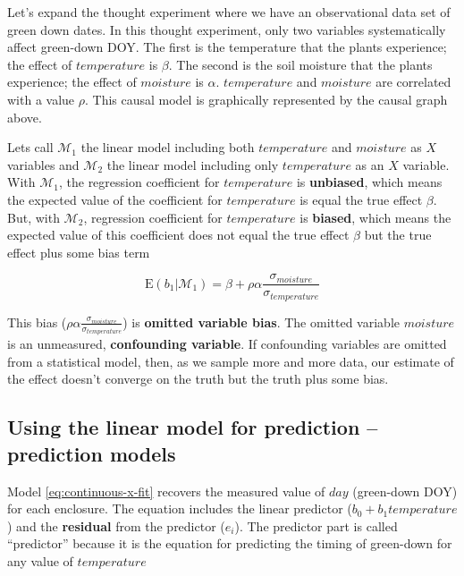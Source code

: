 \documentclass[]{book}
\begin{document}
Let's expand the thought experiment where we have an observational data set of green down dates. In this thought experiment, only two variables systematically affect green-down DOY. The first is the temperature that the plants experience; the effect of \(temperature\) is \(\beta\). The second is the soil moisture that the plants experience; the effect of \(moisture\) is \(\alpha\). \(temperature\) and \(moisture\) are correlated with a value \(\rho\). This causal model is graphically represented by the causal graph above.

Lets call \(\mathcal{M}_1\) the linear model including both \(temperature\) and \(moisture\) as \(X\) variables and \(\mathcal{M}_2\) the linear model including only \(temperature\) as an \(X\) variable. With \(\mathcal{M}_1\), the regression coefficient for \(temperature\) is \textbf{unbiased}, which means the expected value of the coefficient for \(temperature\) is equal the true effect \(\beta\). But, with \(\mathcal{M}_2\), regression coefficient for \(temperature\) is \textbf{biased}, which means the expected value of this coefficient does not equal the true effect \(\beta\) but the true effect plus some bias term

\begin{equation}
\mathrm{E}(b_1|\mathcal{M}_1) = \beta + \rho \alpha \frac{\sigma_{moisture}}{\sigma_{temperature}}
\end{equation}

This bias (\(\rho \alpha \frac{\sigma_{moisture}}{\sigma_{temperature}}\)) is \textbf{omitted variable bias}. The omitted variable \(moisture\) is an unmeasured, \textbf{confounding variable}. If confounding variables are omitted from a statistical model, then, as we sample more and more data, our estimate of the effect doesn't converge on the truth but the truth plus some bias.

\hypertarget{using-the-linear-model-for-prediction-prediction-models}{%
\subsection{Using the linear model for prediction -- prediction models}\label{using-the-linear-model-for-prediction-prediction-models}}

Model \eqref{eq:continuous-x-fit} recovers the measured value of \(day\) (green-down DOY) for each enclosure. The equation includes the linear predictor (\(b_0 + b_1 temperature\)) and the \textbf{residual} from the predictor (\(e_i\)). The predictor part is called ``predictor'' because it is the equation for predicting the timing of green-down for any value of \(temperature\)
\end{document}
